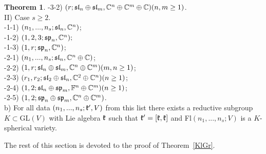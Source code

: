 \documentclass[12pt]{amsart}
\theoremstyle{definition}\newtheorem{theorem}{Theorem}[section]
\theoremstyle{definition}\newtheorem{definition}[proposition]{Definition}
\theoremstyle{remark}\newtheorem{example}[proposition]{Example}
\newcounter{AP}
\begin{document}
\begin{theorem}
-3-2) $(r; \frak{sl}_n\oplus\frak{sl}_m,\mathbb C^n\oplus\mathbb C^m\oplus\mathbb C) (n,m\ge 1)$.\\
\setcounter{AP}{2}II) Case $s\ge 2$.\\
-1-1) $(n_1,..., n_s; \frak{sl}_n, \mathbb C^n)$;\\
-1-2) $(1,2,3; \frak{sp}_n, \mathbb C^n);$\\
-1-3) $(1,r; \frak{sp}_n, \mathbb C^n)$;\\
-2-1) $(n_1,..., n_s; \frak{sl}_n,\mathbb C^n\oplus\mathbb C)$;\\
-2-2) $(1, r; \frak{sl}_n\oplus\frak{sl}_m, \mathbb C^n\oplus\mathbb C^m) (m,n\ge 1)$;\\
-2-3) $(r_1, r_2; \frak{sl}_2\oplus\frak{sl}_n, \mathbb C^2\oplus\mathbb C^n) (n\ge 1)$;\\
-2-4) $(1,2; \frak{sl}_n\oplus\frak{sp}_m, \mathbb  F^n\oplus\mathbb C^m) (n\ge 1)$;\\
-2-5) $(1,2; \frak{sp}_n\oplus\frak{sp}_m, \mathbb C^n\oplus\mathbb C^m)$.\\
b) For all data $(n_1,..., n_s; \frak k', V)$ from this list there exists a reductive subgroup $K\subset$GL$(V)$ with Lie algebra $\frak k$ such that $\frak k'=[\frak k, \frak k]$ and Fl$(n_1,...,n_s; V)$ is a $K$-spherical variety.\end{theorem}
The rest of this section is devoted to the proof of Theorem~\ref{KlGr}.
\end{document}
